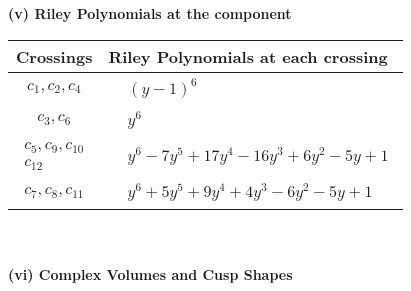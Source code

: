 \documentclass[1p]{elsarticle_modified}
\theoremstyle{definition}
\begin{document}
\newpage\renewcommand{\arraystretch}{1}
\flushleft \textbf{(v) Riley Polynomials at the component}\newline \\
\begin{tabular}{m{50pt}|m{274pt}}
Crossings & \hspace{64pt}Riley Polynomials at each crossing \\
\hline $$\begin{aligned}c_{1},c_{2},c_{4}\end{aligned}$$&$\begin{aligned}
&(y-1)^6
\end{aligned}$\\
\hline $$\begin{aligned}c_{3},c_{6}\end{aligned}$$&$\begin{aligned}
&y^6
\end{aligned}$\\
\hline $$\begin{aligned}c_{5},c_{9},c_{10}\\c_{12}\end{aligned}$$&$\begin{aligned}
&y^6-7 y^5+17 y^4-16 y^3+6 y^2-5 y+1
\end{aligned}$\\
\hline $$\begin{aligned}c_{7},c_{8},c_{11}\end{aligned}$$&$\begin{aligned}
&y^6+5 y^5+9 y^4+4 y^3-6 y^2-5 y+1
\end{aligned}$\\
\hline
\end{tabular}\\~\\
\newpage\flushleft \textbf{(vi) Complex Volumes and Cusp Shapes}
\end{document}
